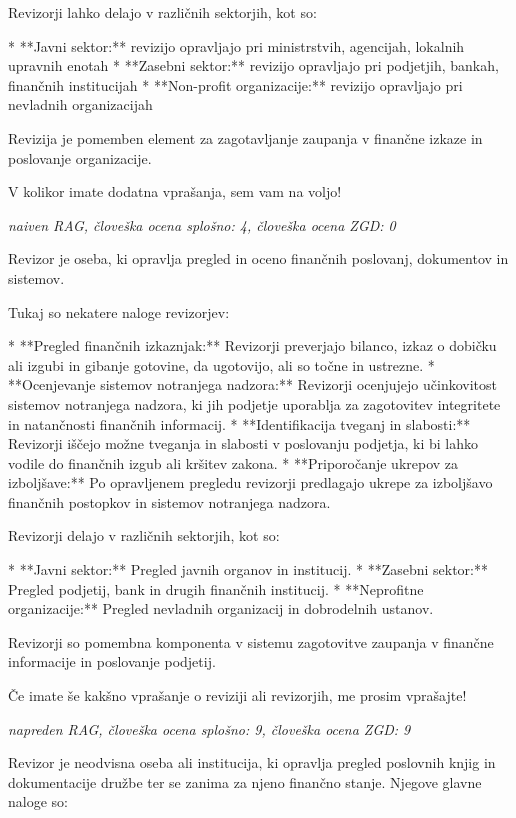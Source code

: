 \documentclass[a4paper,12pt,openright]{book}
\begin{document}
Revizorji lahko delajo v različnih sektorjih, kot so:

* **Javni sektor:** revizijo opravljajo pri ministrstvih, agencijah, lokalnih upravnih enotah
* **Zasebni sektor:** revizijo opravljajo pri podjetjih, bankah, finančnih institucijah
* **Non-profit organizacije:** revizijo opravljajo pri nevladnih organizacijah

Revizija je pomemben element za zagotavljanje zaupanja v finančne izkaze in poslovanje organizacije.


V kolikor imate dodatna vprašanja, sem vam na voljo!

\vspace{0.5cm}
\textit{naiven RAG, človeška ocena splošno: 4, človeška ocena ZGD: 0}

Revizor je oseba, ki opravlja pregled in oceno finančnih poslovanj, dokumentov in sistemov.

Tukaj so nekatere naloge revizorjev:

* **Pregled finančnih izkaznjak:** Revizorji preverjajo bilanco, izkaz o dobičku ali izgubi in gibanje gotovine, da ugotovijo, ali so točne in ustrezne.
* **Ocenjevanje sistemov notranjega nadzora:** Revizorji ocenjujejo učinkovitost sistemov notranjega nadzora, ki jih podjetje uporablja za zagotovitev integritete in natančnosti finančnih informacij.
* **Identifikacija tveganj in slabosti:** Revizorji iščejo možne tveganja in slabosti v poslovanju podjetja, ki bi lahko vodile do finančnih izgub ali kršitev zakona.
* **Priporočanje ukrepov za izboljšave:** Po opravljenem pregledu revizorji predlagajo ukrepe za izboljšavo finančnih postopkov in sistemov notranjega nadzora.

Revizorji delajo v različnih sektorjih, kot so:

* **Javni sektor:**  Pregled javnih organov in institucij.
* **Zasebni sektor:** Pregled podjetij, bank in drugih finančnih institucij.
* **Neprofitne organizacije:** Pregled nevladnih organizacij in dobrodelnih ustanov.

Revizorji so pomembna komponenta v sistemu zagotovitve zaupanja v finančne informacije in poslovanje podjetij.


Če imate še kakšno vprašanje o reviziji ali revizorjih, me prosim vprašajte!

\vspace{0.5cm}
\textit{napreden RAG, človeška ocena splošno: 9, človeška ocena ZGD: 9}

Revizor je neodvisna oseba ali institucija, ki opravlja pregled poslovnih knjig in dokumentacije družbe ter se zanima za njeno finančno stanje. Njegove glavne naloge so:
\end{document}
